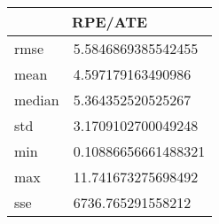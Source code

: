 \begin{table}[!ht] 
 \centering 
 \begin{tabular}{|l|l|} \hline 
 \multicolumn{2}{|c|}{RPE/ATE} \\ \hline 
 rmse & 5.5846869385542455 \\ \hline 
mean & 4.597179163490986 \\ \hline 
median & 5.364352520525267 \\ \hline 
std & 3.1709102700049248 \\ \hline 
min & 0.10886656661488321 \\ \hline 
max & 11.741673275698492 \\ \hline 
sse & 6736.765291558212 \\ \hline 
\end{tabular} 
 \end{table}